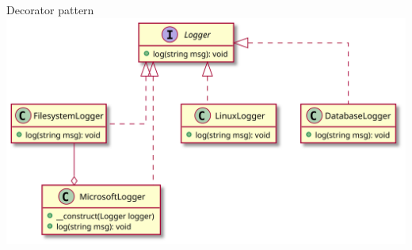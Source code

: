 \begin{frame}[fragile,c]
    \begin{center}
        \large{Decorator pattern}
        \includegraphics[width=\textwidth]{src/session--composition-and-inheritance/resources/decorator-pattern.png}
    \end{center}
\end{frame}

